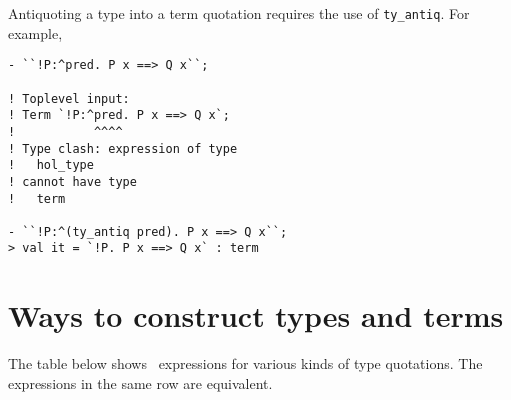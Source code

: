 Antiquoting a type into a term quotation requires the use of {\small\verb+ty_antiq+}. 
For example, 

\begin{session}
\begin{verbatim}
- ``!P:^pred. P x ==> Q x``;

! Toplevel input:
! Term `!P:^pred. P x ==> Q x`;
!           ^^^^
! Type clash: expression of type
!   hol_type
! cannot have type
!   term

- ``!P:^(ty_antiq pred). P x ==> Q x``;
> val it = `!P. P x ==> Q x` : term
\end{verbatim}
\end{session}



\section{Ways to construct types and terms}

The table below shows \ML\ expressions for various kinds of type
quotations.
The expressions in the same row are equivalent.

\bigskip

